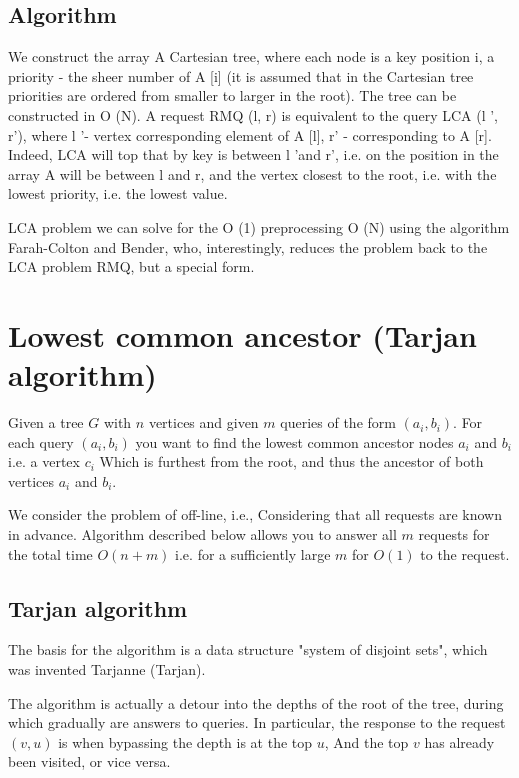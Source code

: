 \subsection{ Algorithm }
We construct the array A Cartesian tree, where each node is a key position i, a priority - the sheer number of A [i] (it is assumed that in the Cartesian tree priorities are ordered from smaller to larger in the root). The tree can be constructed in O (N). A request RMQ (l, r) is equivalent to the query LCA (l ', r'), where l '- vertex corresponding element of A [l], r' - corresponding to A [r]. Indeed, LCA will top that by key is between l 'and r', i.e. on the position in the array A will be between l and r, and the vertex closest to the root, i.e. with the lowest priority, i.e. the lowest value.

LCA problem we can solve for the O (1) preprocessing O (N) using the algorithm Farah-Colton and Bender, who, interestingly, reduces the problem back to the LCA problem RMQ, but a special form.

\section{ Lowest common ancestor (Tarjan algorithm) }
Given a tree $G$ with $n$ vertices and given $m$ queries of the form $(a_i, b_i)$. For each query $(a_i, b_i)$ you want to find the lowest common ancestor nodes $a_i$ and $b_i$ i.e. a vertex $c_i$ Which is furthest from the root, and thus the ancestor of both vertices $a_i$ and $b_i$.

We consider the problem of off-line, i.e., Considering that all requests are known in advance. Algorithm described below allows you to answer all $m$ requests for the total time $O (n + m)$ i.e. for a sufficiently large $m$ for $O (1)$ to the request.

\subsection{ Tarjan algorithm }

The basis for the algorithm is a data structure "system of disjoint sets", which was invented Tarjanne (Tarjan).

The algorithm is actually a detour into the depths of the root of the tree, during which gradually are answers to queries. In particular, the response to the request $(v, u)$ is when bypassing the depth is at the top $u$, And the top $v$ has already been visited, or vice versa.

